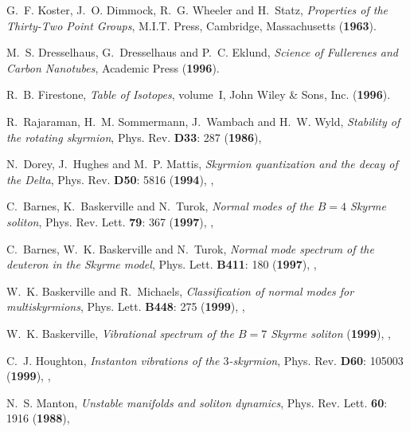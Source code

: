 \documentclass[a4paper,12pt]{article}
\begin{document}
\begin{small}
\begin{thebibliography}{10}
G.~F. Koster, J.~O. Dimmock, R.~G. Wheeler and H.~Statz, {\em Properties of the
  Thirty-Two Point Groups\/}, M.I.T. Press, Cambridge, Massachusetts
 ({\bf 1963}).

M.~S. Dresselhaus, G.~Dresselhaus and P.~C. Eklund, {\em Science of Fullerenes
  and Carbon Nanotubes\/}, Academic Press
 ({\bf 1996}).

R.~B. Firestone, {\em Table of Isotopes\/}, volume~I, John Wiley \& Sons, Inc.
 ({\bf 1996}).

R.~Rajaraman, H.~M. Sommermann, J.~Wambach and H.~W. Wyld, {\em Stability of
  the rotating skyrmion\/}, Phys. Rev. {\bf D33}: 287 ({\bf 1986}),

N.~Dorey, J.~Hughes and M.~P. Mattis, {\em Skyrmion quantization and the decay
  of the {D}elta\/}, Phys. Rev. {\bf D50}: 5816 ({\bf 1994}),
  {},

C.~Barnes, K.~Baskerville and N.~Turok, {\em Normal modes of the ${B} = 4$
  {S}kyrme soliton\/}, Phys. Rev. Lett. {\bf 79}: 367 ({\bf 1997}),
  {},

C.~Barnes, W.~K. Baskerville and N.~Turok, {\em Normal mode spectrum of the
  deuteron in the {S}kyrme model\/}, Phys. Lett. {\bf B411}: 180 ({\bf 1997}),
  {},

W.~K. Baskerville and R.~Michaels, {\em Classification of normal modes for
  multiskyrmions\/}, Phys. Lett. {\bf B448}: 275 ({\bf 1999}),
  {},

W.~K. Baskerville, {\em Vibrational spectrum of the ${B} = 7$ {S}kyrme
  soliton\/}  ({\bf 1999}), {},

C.~J. Houghton, {\em Instanton vibrations of the $3$-skyrmion\/}, Phys. Rev.
  {\bf D60}: 105003 ({\bf 1999}), {},

N.~S. Manton, {\em Unstable manifolds and soliton dynamics\/}, Phys. Rev. Lett.
  {\bf 60}: 1916 ({\bf 1988}),

\end{thebibliography}


\label{lastref}
\end{small}
\end{document}
